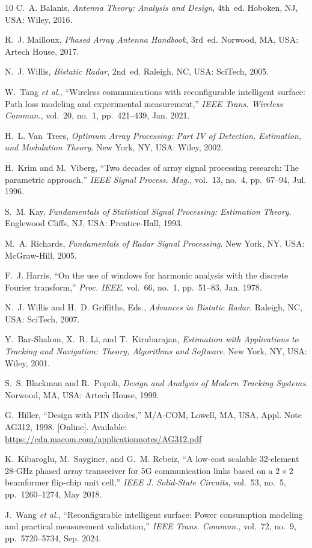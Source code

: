 \documentclass[journal]{IEEEtran}
\begin{document}
\begin{thebibliography}{10}
C.~A. Balanis, \emph{Antenna Theory: Analysis and Design}, 4th~ed. Hoboken, NJ, USA: Wiley, 2016.

R.~J. Mailloux, \emph{Phased Array Antenna Handbook}, 3rd~ed. Norwood, MA, USA: Artech House, 2017.

N.~J. Willis, \emph{Bistatic Radar}, 2nd~ed. Raleigh, NC, USA: SciTech, 2005.

W.~Tang \emph{et al.}, ``Wireless communications with reconfigurable intelligent surface: Path loss modeling and experimental measurement,'' \emph{IEEE Trans. Wireless Commun.}, vol.~20, no.~1, pp.~421--439, Jan. 2021.

H.~L. Van~Trees, \emph{Optimum Array Processing: Part IV of Detection, Estimation, and Modulation Theory}. New York, NY, USA: Wiley, 2002.

H.~Krim and M.~Viberg, ``Two decades of array signal processing research: The parametric approach,'' \emph{IEEE Signal Process. Mag.}, vol.~13, no.~4, pp.~67--94, Jul. 1996.

S.~M. Kay, \emph{Fundamentals of Statistical Signal Processing: Estimation Theory}. Englewood Cliffs, NJ, USA: Prentice-Hall, 1993.

M.~A. Richards, \emph{Fundamentals of Radar Signal Processing}. New York, NY, USA: McGraw-Hill, 2005.

F.~J. Harris, ``On the use of windows for harmonic analysis with the discrete Fourier transform,'' \emph{Proc. IEEE}, vol.~66, no.~1, pp.~51--83, Jan. 1978.

N.~J. Willis and H.~D. Griffiths, Eds., \emph{Advances in Bistatic Radar}. Raleigh, NC, USA: SciTech, 2007.

Y.~Bar-Shalom, X.~R. Li, and T.~Kirubarajan, \emph{Estimation with Applications to Tracking and Navigation: Theory, Algorithms and Software}. New York, NY, USA: Wiley, 2001.

S.~S. Blackman and R.~Popoli, \emph{Design and Analysis of Modern Tracking Systems}. Norwood, MA, USA: Artech House, 1999.

G.~Hiller, ``Design with PIN diodes,'' M/A-COM, Lowell, MA, USA, Appl. Note AG312, 1998. [Online]. Available: \url{https://cdn.macom.com/applicationnotes/AG312.pdf}

K.~Kibaroglu, M.~Sayginer, and G.~M. Rebeiz, ``A low-cost scalable 32-element 28-GHz phased array transceiver for 5G communication links based on a $2\times2$ beamformer flip-chip unit cell,'' \emph{IEEE J. Solid-State Circuits}, vol.~53, no.~5, pp.~1260--1274, May 2018.

J.~Wang \emph{et al.}, ``Reconfigurable intelligent surface: Power consumption modeling and practical measurement validation,'' \emph{IEEE Trans. Commun.}, vol.~72, no.~9, pp.~5720--5734, Sep. 2024.
\end{thebibliography}
\end{document}

